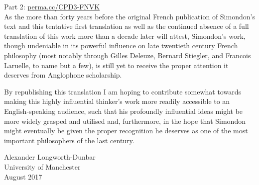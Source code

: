 \documentclass[a4paper]{article}
\begin{document}
Part 2: \href{https://perma.cc/CPD3-FNVK}{perma.cc/CPD3-FNVK}\\

As the more than forty years before the original French publication of Simondon's text and this tentative first translation as well as the continued absence of a full translation of this work more than a decade later will attest, Simondon's work, though undeniable in its powerful influence on late twentieth century French philosophy (most notably through Gilles Deleuze, Bernard Stiegler, and Francois Laruelle, to name but a few), is still yet to receive the proper attention it deserves from Anglophone scholarship.

By republishing this translation I am hoping to contribute somewhat towards making this highly influential thinker's work more readily accessible to an English-speaking audience, such that his profoundly influential ideas might be more widely grasped and utilised and, furthermore, in the hope that Simondon might eventually be given the proper recognition he deserves as one of the most important philosophers of the last century.

\vfill

\begin{flushright}
Alexander Longworth-Dunbar\\
University of Manchester\\
August 2017\\
\end{flushright}

\end{document}
